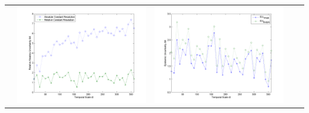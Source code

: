 \documentclass[11pt]{article}
\begin{document}
\begin{table}[H]
{\begin{tabular}{c  c   c   c  c }
&\begin{minipage}{.4\textwidth}\includegraphics[width=\linewidth]{resultgraph/05454500AU.png}\end{minipage}
&\begin{minipage}{.4\textwidth}\includegraphics[width=\linewidth]{resultgraph/05454500EU.png}\end{minipage}
\\

\end{tabular}}
\end{table}
\end{document}
